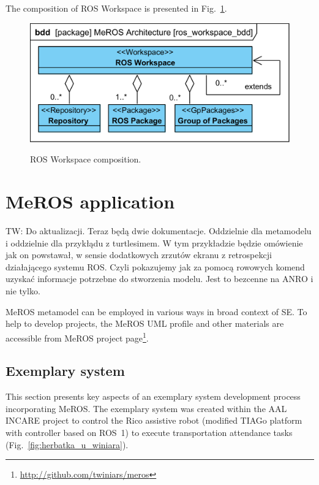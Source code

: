 \documentclass[11pt,oneside,a4paper]{report}
\newcommand{\twci}[1]{
	\textcolor{amber}{TW: #1}}
\begin{document}
The composition of ROS Workspace is presented in Fig.~\ref{fig:ros_workspace_bdd}.

	\begin{figure}[H]
		\centering
		\begin{center}
			{\includegraphics[scale=1.0]{diagrams/ros_workspace_bdd.png}}
		\end{center}
		\caption{ROS Workspace composition.} 
		\label{fig:ros_workspace_bdd}
	\end{figure}

	
\chapter{MeROS application}
\label{ch:application}
	
	\twci{Do aktualizacji. Teraz będą dwie dokumentacje. Oddzielnie dla metamodelu i oddzielnie dla przykłądu z turtlesimem. W tym przykładzie będzie omówienie jak on powstawał, w sensie dodatkowych zrzutów ekranu z retrospekcji działającego systemu ROS. Czyli pokazujemy jak za pomocą rowowych komend uzyskać informacje potrzebne do stworzenia modelu. Jest to bezcenne na ANRO i nie tylko.}
	
	MeROS metamodel can be employed in various ways in broad context of SE. To help to develop projects, the MeROS UML profile and other materials are accessible from MeROS project page\footnote{\url{http://github.com/twiniars/meros}}. 
	
	
\section{Exemplary system}
\label{ch:application-example}

	This section presents key aspects of an exemplary system development process incorporating MeROS. The exemplary system was created within the AAL INCARE project to control the Rico assistive robot (modified TIAGo platform with controller based on ROS~1) to execute transportation attendance tasks (Fig.~\ref{fig:herbatka_u_winiara}).
	
\end{document}
